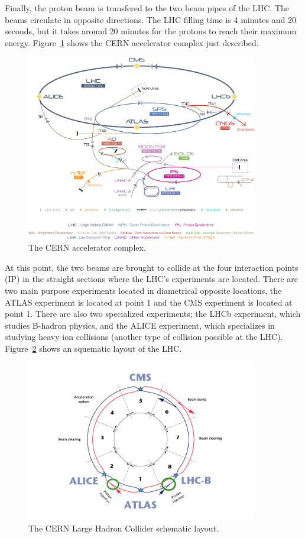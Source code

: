Finally, the proton beam is transfered to the two beam pipes of the
LHC. The beams circulate in opposite directions. The LHC filling time
is 4 minutes and 20 seconds, but it takes around 20 minutes for the
protons to reach their maximum energy. Figure~\ref{fig:cernAcc} shows
the CERN accelerator complex just described.
\begin{figure}
 \centering
 \includegraphics[width=0.9\textwidth]{LHC_fig/Cern-Accelerator-Complex.jpg}
 \caption{The CERN accelerator complex.\label{fig:cernAcc} }
\end{figure}
At this point, the two beams are brought to collide at the four interaction points (IP) in the straight
sections where the LHC's experiments are located. There are two main
purpose experiments located in diametrical opposite locations, the
ATLAS experiment is located at point 1 and the CMS experiment is
located at point 1. There are also two specialized experiments; the
LHCb experiment, which studies B-hadron physics, and the ALICE
experiment, which specializes in studying heavy ion collisions (another type of
collision possible at the LHC). Figure~\ref{fig:LHC} shows an
squematic layout of the LHC.
\begin{figure}
 \centering
 \includegraphics[width=0.9\textwidth]{LHC_fig/LHC_layout.png}
 \caption{The CERN Large Hadron Collider schematic layout.\label{fig:LHC} }
\end{figure}
